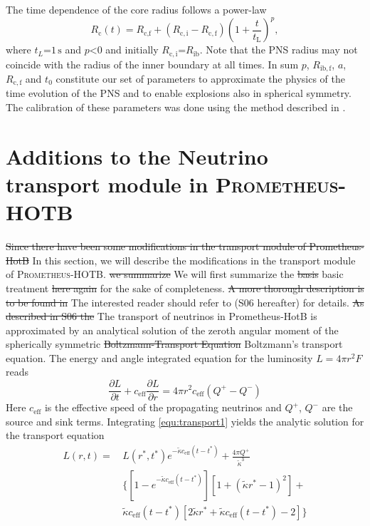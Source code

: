 \documentclass[fleqn,usenatbib]{mnras}
\newcommand{\prom}{\textsc{Prometheus-HOTB}\xspace}
\newcommand{\NY}[2]{{\color{blue}\sout{#1}#2}}
\begin{document}
The time dependence of the core radius follows a power-law 
\begin{equation}
    R_{\mathrm{c}}(t) =R_{\text{c,f}} + (R_{\mathrm{c,i}} - R_{\mathrm{c,f}}) \left(1+\frac{t}{t_{\text{L}}}  \right)^p,
\end{equation}
where $t_L \mathord{=} 1 \, \text{s}$ and $p \mathord{<}0$ and  initially $R_{\mathrm{c,i}}\mathord{=}R_{\mathrm{ib}}$. Note that the PNS radius may not coincide with the radius of the inner boundary at all times.
In sum $p$, $R_{\mathrm{ib,f}}$, $a$, $R_{\mathrm{c,f}}$ and $t_0$ constitute our set of parameters to approximate the physics of the time evolution of the PNS and to enable explosions also in spherical symmetry.
The calibration of these parameters was done using the method described in \citet{Ertl2016}.

\section{Additions to the Neutrino transport module in \prom}
\label{Appendix:Neutrino}
\iffalse
\NY{Since there have been some modifications in the transport module of Prometheus-HotB}{ In this section, we will describe the modifications in the transport module of \prom}. \NY{we summarize}{ We will first summarize} the \NY{basis}{ basic} treatment \NY{here again}{ for the sake of completeness}. \NY{A more thorough description is to be found in }{ The interested reader should refer to} \cite{Scheck2006} (S06 hereafter) \NY{}{for details}. \NY{As described in S06 the}{ The} transport of neutrinos in Prometheus-HotB is approximated by an analytical solution of the zeroth angular moment of the spherically symmetric \NY{Boltzmann-Transport Equation}{ Boltzmann's transport equation}. The energy and angle integrated equation for the luminosity $L=4\pi r^2 F$ reads
\begin{equation}
\label{equ:transport1}
\frac{\partial L}{\partial t} + c_{\mathrm{eff}} \frac{\partial L }{\partial r} = 4 \pi r^2 c_{\mathrm{eff}} (Q^+ - Q^-)
\end{equation}
Here $c_{\mathrm{eff}}$ is the effective speed of the propagating neutrinos and $Q^+$, $Q^-$ are the source and sink terms.
Integrating \ref{equ:transport1} yields the analytic solution for the transport equation
\begin{equation}
\begin{split}
L(r,t) = \, & L(r^*,t^{*}) e^{- \tilde{\kappa} c_{\mathrm{eff}} (t-t^{*}) } + \frac{4\pi Q^{+}}{\tilde{\kappa}^3}\\
& \Big\{ [ 1 - e^{-\tilde{\kappa} c_{\mathrm{eff}} (t-t^{*} )} ] [ 1 + (\tilde{\kappa}r^{*} -1)^2 ] + \\
& \tilde{\kappa} c_{\mathrm{eff}} (t - t^{*} ) [ 2 \tilde{\kappa} r^{*} + \tilde{\kappa} c_{\mathrm{eff}} (t-t^{*}) - 2 ] \Big\}\\
\end{split}
\end{equation}
\end{document}
